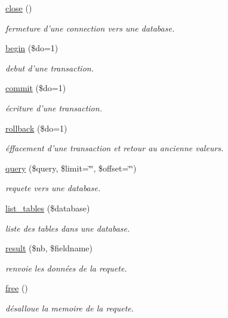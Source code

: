 \begin{CompactItemize}
\hyperlink{classDoliDb_a6}{close} ()
\begin{CompactList}\small\item\em fermeture d'une connection vers une database. \item\end{CompactList}\item 
\hyperlink{classDoliDb_a7}{begin} (\$do=1)
\begin{CompactList}\small\item\em debut d'une transaction. \item\end{CompactList}\item 
\hyperlink{classDoliDb_a8}{commit} (\$do=1)
\begin{CompactList}\small\item\em \'{e}criture d'une transaction. \item\end{CompactList}\item 
\hyperlink{classDoliDb_a9}{rollback} (\$do=1)
\begin{CompactList}\small\item\em \'{e}ffacement d'une transaction et retour au ancienne valeurs. \item\end{CompactList}\item 
\hyperlink{classDoliDb_a10}{query} (\$query, \$limit=\char`\"{}\char`\"{}, \$offset=\char`\"{}\char`\"{})
\begin{CompactList}\small\item\em requete vers une database. \item\end{CompactList}\item 
\hyperlink{classDoliDb_a11}{list\_\-tables} (\$database)
\begin{CompactList}\small\item\em liste des tables dans une database. \item\end{CompactList}\item 
\hyperlink{classDoliDb_a12}{result} (\$nb, \$fieldname)
\begin{CompactList}\small\item\em renvoie les donn\'{e}es de la requete. \item\end{CompactList}\item 
\hyperlink{classDoliDb_a13}{free} ()
\begin{CompactList}\small\item\em d\'{e}salloue la memoire de la requete. \item\end{CompactList}\item 

\end{CompactItemize}
